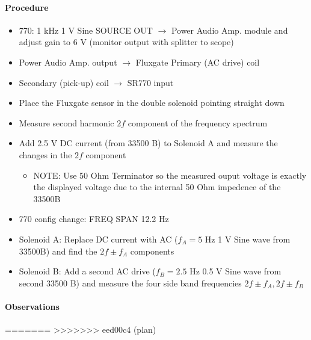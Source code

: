 \documentclass[../main.tex]{subfiles}
\begin{document}
\paragraph{Procedure}
\begin{itemize}
    \item 770: 1 kHz 1 V Sine SOURCE OUT $\to$ Power Audio Amp. module and adjust gain to 6 V (monitor output with splitter to scope)
    \item Power Audio Amp. output $\to$ Fluxgate Primary (AC drive) coil
    \item Secondary (pick-up) coil $\to$ SR770 input
    \item Place the Fluxgate sensor in the double solenoid pointing straight down   
    \item Measure second harmonic $2f$ component of the frequency spectrum
    \item Add 2.5 V DC current (from 33500 B) to Solenoid A and measure the changes in the $2f$ component
    \begin{itemize}
        \item NOTE: Use 50 Ohm Terminator so the measured ouput voltage is exactly the displayed voltage due to the internal 50 Ohm impedence of the 33500B
    \end{itemize}
    \item 770 config change: FREQ SPAN 12.2 Hz
    \item Solenoid A: Replace DC current with AC ($f_A = 5$ Hz 1 V Sine wave from 33500B) and find the $2f \pm f_A$ components
    \item Solenoid B: Add a second AC drive ($f_B = 2.5$ Hz 0.5 V Sine wave from second 33500 B) and measure the four side band frequencies $2f \pm f_A, 2f \pm f_B$
\end{itemize}

\paragraph{Observations}
=======
>>>>>>> eed00c4 (plan)
\end{document}
